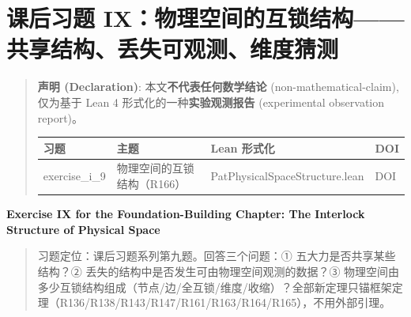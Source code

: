 \documentclass[
]{article}
\author{}
\date{}
\newcounter{none} %
\begin{document}
\section{课后习题
IX：物理空间的互锁结构------共享结构、丢失可观测、维度猜测}\label{ux7b51ux57faux7bc7ux8bfeux540eux4e60ux9898-ixux7269ux7406ux7a7aux95f4ux7684ux4e92ux9501ux7ed3ux6784ux5171ux4eabux7ed3ux6784ux4e22ux5931ux53efux89c2ux6d4bux7ef4ux5ea6ux731cux6d4b}

\begin{quote}
\textbf{声明 (Declaration)}: 本文\textbf{不代表任何数学结论}
(non-mathematical-claim), 仅为基于 Lean 4
形式化的一种\textbf{实验观测报告} (experimental observation report)。

{\def\LTcaptype{none} %
\begin{longtable}[]{@{}
 >{\raggedright\arraybackslash}p{}
 >{\raggedright\arraybackslash}p{}
 >{\raggedright\arraybackslash}p{}
 >{\raggedright\arraybackslash}p{}@{}}
\toprule\noalign{}
\begin{minipage}[b]{\linewidth}\raggedright
习题
\end{minipage} & \begin{minipage}[b]{\linewidth}\raggedright
主题
\end{minipage} & \begin{minipage}[b]{\linewidth}\raggedright
Lean 形式化
\end{minipage} & \begin{minipage}[b]{\linewidth}\raggedright
DOI
\end{minipage} \\
\midrule\noalign{}
\endhead
\bottomrule\noalign{}
\endlastfoot
exercise\_i\_9 & 物理空间的互锁结构（R166） &
PatPhysicalSpaceStructure.lean & DOI \\
\end{longtable}
}
\end{quote}

\textbf{Exercise IX for the Foundation-Building Chapter: The Interlock
Structure of Physical Space}

\begin{quote}
习题定位：课后习题系列第九题。回答三个问题：①
五大力是否共享某些结构？② 丢失的结构中是否发生可由物理空间观测的数据？③
物理空间由多少互锁结构组成（节点/边/全互锁/维度/收缩）？全部新定理只锚框架定理（R136/R138/R143/R147/R161/R163/R164/R165），不用外部引理。
\end{quote}
\end{document}
